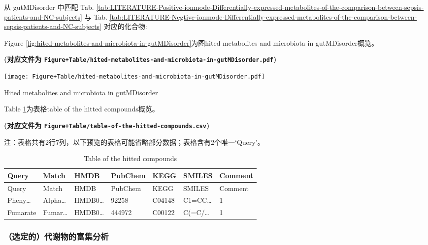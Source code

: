 \documentclass[
]{article}
\begin{document}
从 gutMDisorder 中匹配 Tab. \ref{tab:LITERATURE-Positive-ionmode-Differentially-expressed-metabolites-of-the-comparison-between-sepsis-patients-and-NC-subjects} 与 Tab. \ref{tab:LITERATURE-Negtive-ionmode-Differentially-expressed-metabolites-of-the-comparison-between-sepsis-patients-and-NC-subjects} 对应的化合物:

Figure \ref{fig:hited-metabolites-and-microbiota-in-gutMDisorder}为图hited metabolites and microbiota in gutMDisorder概览。

\textbf{(对应文件为 \texttt{Figure+Table/hited-metabolites-and-microbiota-in-gutMDisorder.pdf})}

\def\@captype{figure}
\begin{center}
\texttt{[image: Figure+Table/hited-metabolites-and-microbiota-in-gutMDisorder.pdf]}
\caption{Hited metabolites and microbiota in gutMDisorder}\label{fig:hited-metabolites-and-microbiota-in-gutMDisorder}
\end{center}

Table \ref{tab:table-of-the-hitted-compounds}为表格table of the hitted compounds概览。

\textbf{(对应文件为 \texttt{Figure+Table/table-of-the-hitted-compounds.csv})}

\begin{center}\begin{tcolorbox}[colback=gray!10, colframe=gray!50, width=0.9\linewidth, arc=1mm, boxrule=0.5pt]注：表格共有2行7列，以下预览的表格可能省略部分数据；表格含有2个唯一`Query'。
\end{tcolorbox}
\end{center}

\begin{longtable}[]{@{}lllllll@{}}
\caption{\label{tab:table-of-the-hitted-compounds}Table of the hitted compounds}\tabularnewline
\toprule
Query & Match & HMDB & PubChem & KEGG & SMILES & Comment\tabularnewline
\midrule
\endfirsthead
\toprule
Query & Match & HMDB & PubChem & KEGG & SMILES & Comment\tabularnewline
\midrule
\endhead
Pheny\ldots{} & Alpha\ldots{} & HMDB0\ldots{} & 92258 & C04148 & C1=CC\ldots{} & 1\tabularnewline
Fumarate & Fumar\ldots{} & HMDB0\ldots{} & 444972 & C00122 & C(=C/\ldots{} & 1\tabularnewline
\bottomrule
\end{longtable}

\hypertarget{ux9009ux5b9aux7684ux4ee3ux8c22ux7269ux7684ux5bccux96c6ux5206ux6790}{%
\subsubsection{（选定的）代谢物的富集分析}\label{ux9009ux5b9aux7684ux4ee3ux8c22ux7269ux7684ux5bccux96c6ux5206ux6790}}
\end{document}
